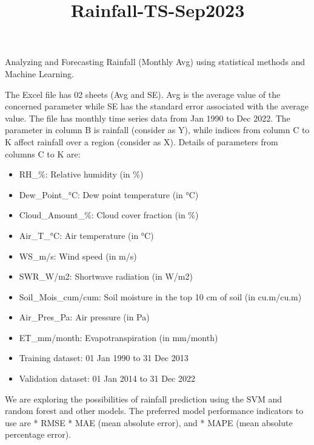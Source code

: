 \documentclass[11pt]{article}
\title{Rainfall-TS-Sep2023}
\begin{document}
    
    \maketitle
    
    

    
    Analyzing and Forecasting Rainfall (Monthly Avg) using statistical
methods and Machine Learning.

The Excel file has 02 sheets (Avg and SE). Avg is the average value of
the concerned parameter while SE has the standard error associated with
the average value. The file has monthly time series data from Jan 1990
to Dec 2022. The parameter in column B is rainfall (consider as Y),
while indices from column C to K affect rainfall over a region (consider
as X). Details of parameters from columns C to K are:

\begin{itemize}
\item
  RH\_\%: Relative humidity (in \%)
\item
  Dew\_Point\_°C: Dew point temperature (in °C)
\item
  Cloud\_Amount\_\%: Cloud cover fraction (in \%)
\item
  Air\_T\_°C: Air temperature (in °C)
\item
  WS\_m/s: Wind speed (in m/s)
\item
  SWR\_W/m2: Shortwave radiation (in W/m2)
\item
  Soil\_Mois\_cum/cum: Soil moisture in the top 10 cm of soil (in
  cu.m/cu.m)
\item
  Air\_Pres\_Pa: Air pressure (in Pa)
\item
  ET\_mm/month: Evapotranspiration (in mm/month)
\item
  Training dataset: 01 Jan 1990 to 31 Dec 2013
\item
  Validation dataset: 01 Jan 2014 to 31 Dec 2022
\end{itemize}

We are exploring the possibilities of rainfall prediction using the SVM
and random forest and other models. The preferred model performance
indicators to use are * RMSE * MAE (mean absolute error), and * MAPE
(mean absolute percentage error).
\end{document}
